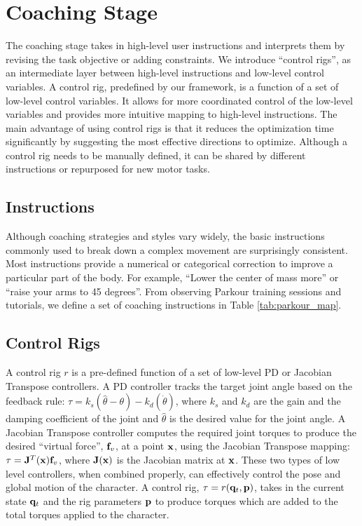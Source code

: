 \section{Coaching Stage}
The coaching stage takes in high-level user instructions and
interprets them by revising the task objective or adding
constraints. We introduce ``control rigs'', as an intermediate layer
between high-level instructions and low-level control variables. A
control rig, predefined by our framework, is a function of a set of
low-level control variables. It allows for more coordinated control of
the low-level variables and provides more intuitive mapping to
high-level instructions. The main advantage of using control
rigs is that it reduces the optimization time significantly by
suggesting the most effective directions to optimize. Although a
control rig needs to be manually defined, it can be shared by
different instructions or repurposed for new motor tasks.

\subsection{Instructions}
\label{sec:parkour_instructions}

Although coaching strategies and styles vary widely, the basic
instructions commonly used to break down a complex movement are
surprisingly consistent. Most instructions provide a numerical or
categorical correction to improve a particular part of the body. For example,
``Lower the center of mass more'' or ``raise your arms to 45 degrees''.  
From observing Parkour training sessions and tutorials, we
define a set of coaching instructions in Table \ref{tab:parkour_map}.

\subsection{Control Rigs}
A control rig $r$ is a pre-defined function of a set of low-level PD
or Jacobian Transpose controllers.  A PD controller tracks
the target joint angle based on the feedback rule: $\tau = k_s
(\hat{\theta} -\theta) - k_d (\dot{\theta})$, where $k_s$ and $k_d$
are the gain and the damping coefficient of the joint and
$\hat{\theta}$ is the desired value for the joint angle. A Jacobian
Transpose controller computes the required joint torques to produce
the desired ``virtual force'', $\mathbf{f}_v$, at a point $\mathbf{x}$,
using the Jacobian Transpose mapping: $\tau =
\mathbf{J}^T(\mathbf{x})\mathbf{f}_v$, where $\mathbf{J}(\mathbf{x})$ is the Jacobian
matrix at $\mathbf{x}$. These two types of low level controllers, when
combined properly, can effectively control the pose and global motion
of the character. A control rig, $\tau = r(\mathbf{q}_t, \mathbf{p})$, takes
in the current state $\mathbf{q}_t$ and the rig parameters $\mathbf{p}$ to
produce torques which are added to the total torques applied to the
character.


